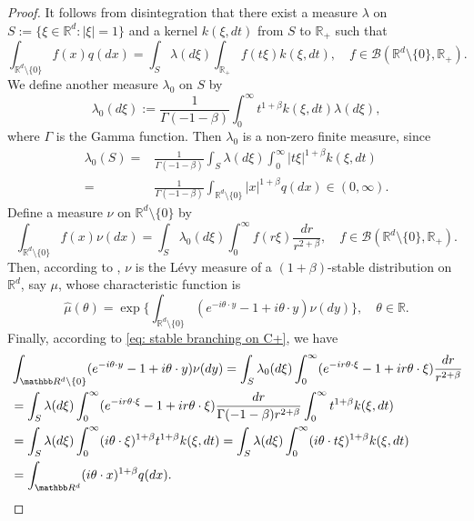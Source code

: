 \documentclass[EJP]{ejpecp} %
\begin{document}
\begin{proof}
	It follows from disintegration that there exist a measure $\lambda$ on $S:= \{\xi\in \mathbb R^d:|\xi| = 1\}$ and a kernel $k(\xi,dt)$ from $S$ to $\mathbb R_+$ such that
\[
    \int_{\mathbb R^d\setminus \{0\}} f(x)q(dx)
    = \int_S \lambda(d\xi) \int_{\mathbb R_+} f(t \xi)k(\xi,dt),
    \quad f\in \mathcal B(\mathbb R^d\setminus \{0\}, \mathbb R_+).
\]
	We define another measure $\lambda_0$ on $S$ by
\[
    \lambda_0(d\xi)
    := \frac1{\Gamma(-1-\beta)}\int_0^\infty t^{1+\beta}k(\xi,dt) \lambda (d\xi),
\]
	where $\Gamma$ is the Gamma function.
	Then $\lambda_0$ is a non-zero finite measure, since
\begin{align}
    \lambda_0(S)
     = &\frac{1}{\Gamma(-1-\beta)} \int_S \lambda (d\xi) \int_0^\infty |t\xi|^{1+\beta}k(\xi,dt) \\
   	=  & \frac{1}{\Gamma(-1-\beta)} \int_{\mathbb R^d\setminus\{0\}} |x|^{1+\beta} q(dx) \in (0,\infty).
\end{align}
	Define a measure $\nu$ on $\mathbb R^d\setminus\{0\}$ by
\[
    \int_{\mathbb R^d\setminus\{0\}}f(x)\nu(dx)
    = \int_{S} \lambda_0(d\xi) \int_0^\infty f(r\xi) \frac{dr}{r^{2+\beta}},
    \quad f\in \mathcal B(\mathbb R^d\setminus \{0\}, \mathbb R_+).
\]
	Then, according to \cite[Remark 14.4]{Sato2013Levy}, $\nu$ is the L\'evy measure of a $(1+\beta)$-stable distribution on $\mathbb R^d$, say $\mu$, whose characteristic function is
\[
    \hat \mu(\theta)
    = \exp \Big \{ \int_{\mathbb R^d\setminus\{0\}} (e^{-i\theta \cdot y}-1+i\theta \cdot y) \nu(dy) \Big \},
    \quad \theta \in \mathbb R.
\]
	Finally, according to \eqref{eq: stable branching on C+}, we have
\begin{align}
   	& \int_{\mathbb R^d\setminus\{0\}} (e^{-i\theta \cdot y}-1+i\theta \cdot y) \nu(dy)
   	= \int_S \lambda_0(d\xi) \int_0^\infty (e^{-ir\theta \cdot \xi}-1+ir\theta \cdot \xi) \frac{dr}{r^{2+\beta}} \\
   	& = \int_S \lambda (d\xi) \int_0^\infty (e^{-ir\theta \cdot \xi}-1+ir\theta \cdot \xi) \frac{dr}{\Gamma(-1-\beta)r^{2+\beta}}\int_0^\infty t^{1+\beta} k(\xi,dt) \\
    & = \int_S \lambda (d\xi) \int_0^\infty (i\theta\cdot \xi)^{1+\beta} t^{1+\beta} k(\xi,dt)
    = \int_S \lambda(d\xi) \int_0^\infty (i\theta \cdot t\xi)^{1+\beta} k(\xi,dt) \\
   	& = \int_{\mathbb R^d} (i\theta \cdot x)^{1+\beta} q(dx).
\qedhere
\end{align}
\end{proof}
\end{document}
